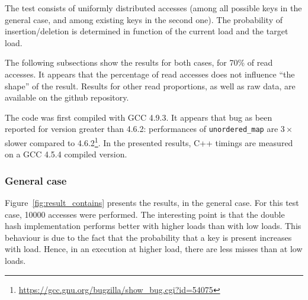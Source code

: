 \documentclass[oneside]{article}
\begin{document}
The test consists of uniformly distributed accesses (among all possible keys in the general case, and among existing keys in the second one). The probability of insertion/deletion is determined in function of the current load and the target load.

The following subsections show the results for both cases, for 70\% of read accesses. It appears that the percentage of read accesses does not influence ``the shape'' of the result. Results for other read proportions, as well as raw data, are available on the github repository.

The code was first compiled with GCC 4.9.3. It appears that bug as been reported for version greater than 4.6.2: performances of \texttt{unordered\_map} are $3\times$ slower compared to 4.6.2\footnote{\url{https://gcc.gnu.org/bugzilla/show_bug.cgi?id=54075}}. In the presented results, C++ timings are measured on a GCC 4.5.4 compiled version.
\subsubsection{General case}
Figure~\ref{fig:result_contains} presents the results, in the general case. For this test case, 10000 accesses were performed. The interesting point is that the double hash implementation performs better with higher loads than with low loads. This behaviour is due to the fact that the probability that a key is present increases with load. Hence, in an execution at higher load, there are less misses than at low loads. 
\end{document}
